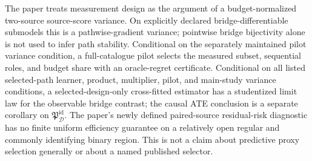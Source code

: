 The paper treats measurement design as the argument of a budget-normalized two-source source-score variance.  On explicitly declared bridge-differentiable submodels this is a pathwise-gradient variance; pointwise bridge bijectivity alone is not used to infer path stability.  Conditional on the separately maintained pilot variance condition, a full-catalogue pilot selects the measured subset, sequential roles, and budget share with an oracle-regret certificate.  Conditional on all listed selected-path learner, product, multiplier, pilot, and main-study variance conditions, a selected-design-only cross-fitted estimator has a studentized limit law for the observable bridge contrast; the causal ATE conclusion is a separate corollary on \(\mathfrak P_{\mathcal D}^{\mathrm{id}}\).  The paper's newly defined paired-source residual-risk diagnostic has no finite uniform efficiency guarantee on a relatively open regular and commonly identifying binary region.  This is not a claim about predictive proxy selection generally or about a named published selector.